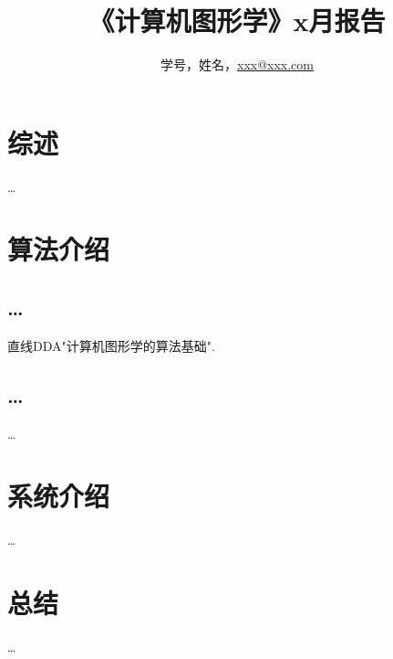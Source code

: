\documentclass[a4paper,UTF8]{article}
\theoremstyle{definition}
\begin{document}
\title{\textbf{《计算机图形学》x月报告}}
\author{学号，姓名，\href{mailto:xxx@xxx.com}{xxx@xxx.com}}
\maketitle

\section{综述}
\dots

\section{算法介绍}
\subsection{\dots}
直线DDA"计算机图形学的算法基础".\cite{cg_teach}\\
\cite{Wille1982}
\subsection{\dots}
\dots
		
\section{系统介绍}
\dots

\section{总结}
\dots

%

\end{document}
